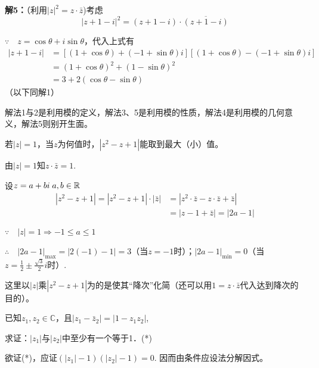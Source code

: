 \begin{solution}
\begin{minipage}{.4\textwidth}
\begin{tikzpicture}[>=stealth, scale=1.5]
\end{tikzpicture}
\end{minipage}

\textbf{解5：}（利用$|z|^2=z\cdot \bar z$)考虑
\[|z+1-i|^2=(z+1-i)\cdot \overline{(z+1-i)}\]

$\because\quad z=\cos\theta+i\sin\theta$，代入上式有
\[\begin{split}
|z+1-i|&=[(1+\cos\theta)+(-1+\sin\theta)i][(1+\cos\theta)-(-1+\sin\theta)i]\\
&=(1+\cos\theta)^2+(1-\sin\theta)^2\\
&=3+2(\cos\theta-\sin\theta)    
\end{split}\]
（以下同解1）
\end{solution}

\begin{rmk}
    解法1与2是利用模的定义，解法3、5是利用模的性质，解法4是利用模的几何意义，解法5则别开生面。
\end{rmk}

\begin{example}
    若$|z|=1$，当$z$为何值时，$|z^2-z+1|$能取到最大（小）值。
\end{example}

\begin{solution}
由$|z|=1$知$z\cdot \bar z=1$.

设$z=a+bi\; a,b\in\R$
\[\begin{split}
    |z^2-z+1|=|z^2-z+1|\cdot |\bar z|&=|z^2\cdot \bar z-z\cdot \bar z+\bar z|\\
    &=|z-1+\bar z|=|2a-1|
\end{split}\]

$\because\quad |z|=1\Rightarrow -1\le a\le 1$

$\therefore\quad |2a-1|_{\max}=|2(-1)-1|=3$（当$z=-1$时）；$|2a-1|_{\min}=0$（当$z=\frac{1}{2}\pm\frac{\sqrt{3}}{2}i$时）.
\end{solution}

\begin{rmk}
    这里以$|z|$乘$|z^2-z+1|$为的是使其“降次”化简（还可以用$1=z\cdot \bar z$代入达到降次的目的）。
\end{rmk}

\begin{example}
    已知$z_1,z_2\in\mathbb{C}$，且$|z_1-\bar z_2|=|1-z_1z_2|$,

求证：$|z_1|$与$|z_2|$中至少有一个等于1．\hfill (*)
\end{example}

\begin{analyze}
    欲证(*)，应证$(|z_1|-1)(|z_2|-1)=0$. 因而由条件应设法分解因式。
\end{analyze}

